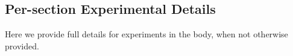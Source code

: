 




\subsection{Per-section Experimental Details}
\label{sec:secexp}
Here we provide full details for experiments in the body, when not otherwise provided.

